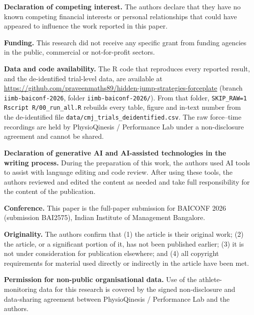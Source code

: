 \documentclass[12pt,a4paper]{article}
\begin{document}
\medskip
\noindent\textbf{Declaration of competing interest.} The authors declare that they have no known competing financial interests or personal relationships that could have appeared to influence the work reported in this paper.

\medskip
\noindent\textbf{Funding.} This research did not receive any specific grant from funding agencies in the public, commercial or not-for-profit sectors.

\medskip
\noindent\textbf{Data and code availability.} The R code that reproduces every reported result, and the de-identified trial-level data, are available at \url{https://github.com/praveenmaths89/hidden-jump-strategies-forceplate} (branch \texttt{iimb-baiconf-2026}, folder \texttt{iimb-baiconf-2026/}). From that folder, \texttt{SKIP\_RAW=1 Rscript R/00\_run\_all.R} rebuilds every table, figure and in-text number from the de-identified file \texttt{data/cmj\_trials\_deidentified.csv}. The raw force--time recordings are held by PhysioQinesis / Performance Lab under a non-disclosure agreement and cannot be shared.

\medskip
\noindent\textbf{Declaration of generative AI and AI-assisted technologies in the writing process.} During the preparation of this work, the authors used AI tools to assist with language editing and code review. After using these tools, the authors reviewed and edited the content as needed and take full responsibility for the content of the publication.

\medskip
\noindent\textbf{Conference.} This paper is the full-paper submission for BAICONF 2026 (submission BAI2575), Indian Institute of Management Bangalore.

\medskip
\noindent\textbf{Originality.} The authors confirm that (1) the article is their original work; (2) the article, or a significant portion of it, has not been published earlier; (3) it is not under consideration for publication elsewhere; and (4) all copyright requirements for material used directly or indirectly in the article have been met.

\medskip
\noindent\textbf{Permission for non-public organisational data.} Use of the athlete-monitoring data for this research is covered by the signed non-disclosure and data-sharing agreement between PhysioQinesis / Performance Lab and the authors.
\end{document}
